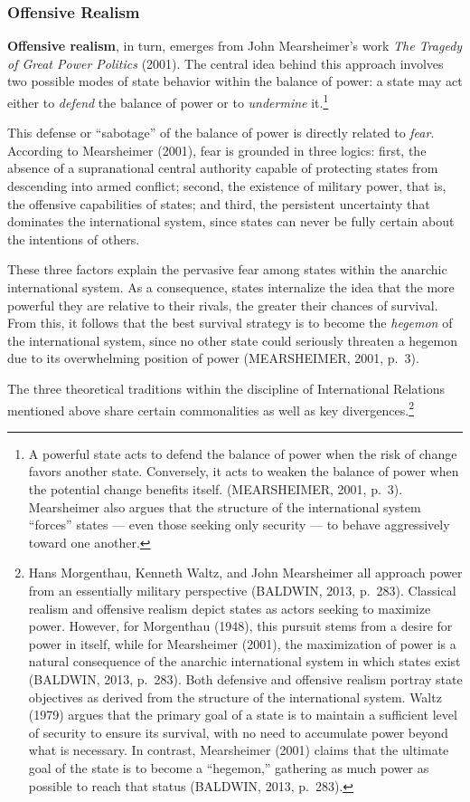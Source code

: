 \subsubsection{Offensive Realism}

\textbf{Offensive realism}, in turn, emerges from John Mearsheimer’s work \textit{The Tragedy of Great Power Politics} (2001). The central idea behind this approach involves two possible modes of state behavior within the balance of power: a state may act either to \textit{defend} the balance of power or to \textit{undermine} it.\footnote{A powerful state acts to defend the balance of power when the risk of change favors another state. Conversely, it acts to weaken the balance of power when the potential change benefits itself. (MEARSHEIMER, 2001, p.~3). Mearsheimer also argues that the structure of the international system “forces” states --- even those seeking only security --- to behave aggressively toward one another.} 

This defense or “sabotage” of the balance of power is directly related to \textit{fear}. According to Mearsheimer (2001), fear is grounded in three logics: first, the absence of a supranational central authority capable of protecting states from descending into armed conflict; second, the existence of military power, that is, the offensive capabilities of states; and third, the persistent uncertainty that dominates the international system, since states can never be fully certain about the intentions of others. 

These three factors explain the pervasive fear among states within the anarchic international system. As a consequence, states internalize the idea that the more powerful they are relative to their rivals, the greater their chances of survival. From this, it follows that the best survival strategy is to become the \textit{hegemon} of the international system, since no other state could seriously threaten a hegemon due to its overwhelming position of power (MEARSHEIMER, 2001, p.~3).

\bigskip

The three theoretical traditions within the discipline of International Relations mentioned above share certain commonalities as well as key divergences.\footnote{Hans Morgenthau, Kenneth Waltz, and John Mearsheimer all approach power from an essentially military perspective (BALDWIN, 2013, p.~283). Classical realism and offensive realism depict states as actors seeking to maximize power. However, for Morgenthau (1948), this pursuit stems from a desire for power in itself, while for Mearsheimer (2001), the maximization of power is a natural consequence of the anarchic international system in which states exist (BALDWIN, 2013, p.~283). Both defensive and offensive realism portray state objectives as derived from the structure of the international system. Waltz (1979) argues that the primary goal of a state is to maintain a sufficient level of security to ensure its survival, with no need to accumulate power beyond what is necessary. In contrast, Mearsheimer (2001) claims that the ultimate goal of the state is to become a “hegemon,” gathering as much power as possible to reach that status (BALDWIN, 2013, p.~283).} 

